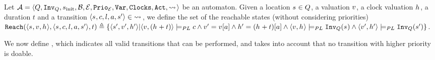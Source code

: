 \begin{definition}[Transition]
\label{sec:system-definition}Let $\mathcal{A}{} = \allowbreak{}
\langle Q{}, \allowbreak{}
\text{\texttt{Inv}\textsubscript{\ensuremath{Q}{}}}{}, \allowbreak{}
s_{\text{init}}{}, \allowbreak{}
\mathcal{B}{}, \allowbreak{}
\mathcal{E}{}, \allowbreak{}
\text{\texttt{Prio}\textsubscript{\ensuremath{\mathcal{E}}}}{}, \allowbreak{}
\text{\texttt{Var}}{}, \allowbreak{}
\text{\texttt{Clocks}}{}, \allowbreak{}
\text{\texttt{Act}}{}, \allowbreak{}
{\rightsquigarrow{}\!}{}\rangle$ be an automaton. Given a location $s_{} \in Q{}$, a valuation $v_{}$, a clock valuation $h_{}$, a duration $t$ and a transition $\langle s_{}, c, l, a, s_{}' \rangle \in {\rightsquigarrow{}\!}{}$, we define the set of the reachable states (without considering priorities) $\text{\texttt{Reach}}{}(\langle s_{}, v_{}, h_{}\rangle, \langle s_{}, c, l, a, s_{}' \rangle, t) \triangleq \{\langle s_{}', v_{}', h_{}' \rangle |
      \langle v_{}, (h_{} + t) \rangle \models_{PL} c
      \land
      v_{}' = v_{}[a]
      \land
      h_{}' = (h_{} + t)[a]
      \land
      \langle v_{}, h_{} \rangle \models_{PL} \text{\texttt{Inv}\textsubscript{\ensuremath{Q}{}}}{}(s_{})
      \land
      \langle v_{}', h_{}' \rangle \models_{PL} \text{\texttt{Inv}\textsubscript{\ensuremath{Q}{}}}{}(s_{}')\}$.

We now define \automatanext{}, which
indicates all valid transitions that can be performed, and takes into account that no transition with higher priority is doable.


\end{definition}

